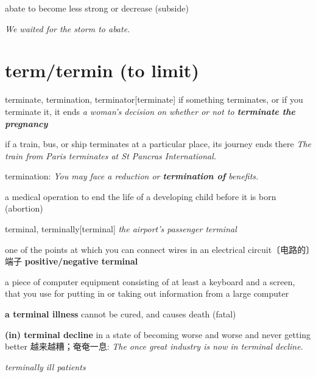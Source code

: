 \begin{DefWord}{abate}
    to become less strong or decrease (subside)

    \textit{We waited for the storm to abate.}
\end{DefWord}

\section{term/termin (to limit)}

\begin{DefWord}{terminate, termination, terminator}[terminate]
    if something terminates, or if you terminate it, it ends
    \textit{a woman's decision on whether or not to \textbf{terminate the pregnancy}}

    if a train, bus, or ship terminates at a particular place, its journey ends there
    \textit{The train from Paris terminates at St Pancras International.}

    termination:
    \textit{You may face a reduction or \textbf{termination of} benefits.}

    a medical operation to end the life of a developing child before it is born (abortion)
\end{DefWord}

\begin{DefWord}{terminal, terminally}[terminal]
    \textit{the airport's passenger terminal}

    one of the points at which you can connect wires in an electrical circuit〔电路的〕端子
\textbf{positive/negative terminal}

a piece of computer equipment consisting of at least a keyboard and a screen, that you use for putting in or taking out information from a large computer

\textbf{a terminal illness} cannot be cured, and causes death (fatal)

\textbf{(in) terminal decline} in a state of becoming worse and worse and never getting better 越来越糟；奄奄一息:
 \textit{The once great industry is now in terminal decline.}

 \textit{terminally ill patients}
\end{DefWord}

